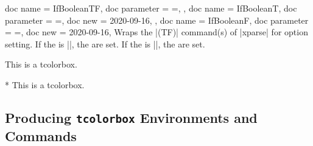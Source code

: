 \medskip

\begin{docTcbKeys}[doc description = {no default}]
  {
    {
      doc name        = IfBooleanTF,
      doc parameter   = {=},
    },
    {
      doc name        = IfBooleanT,
      doc parameter   = {=},
      doc new         = 2020-09-16,
    },
    {
      doc name        = IfBooleanF,
      doc parameter   = {=},
      doc new         = 2020-09-16,
    }
  }
  Wraps the |\IfBoolean(TF)| command(s) of |xparse| for option setting.
  If the  is |\BooleanTrue|, the  are set.
  If the  is |\BooleanFalse|, the  are set.

\begin{dispExample}

\begin{mybox}
This is a tcolorbox.
\end{mybox}

\begin{mybox}*
This is a tcolorbox.
\end{mybox}
\end{dispExample}
\end{docTcbKeys}



\clearpage
\subsection{Producing \texttt{tcolorbox} Environments and Commands}\label{subsec:xparse_tcolorbox}

